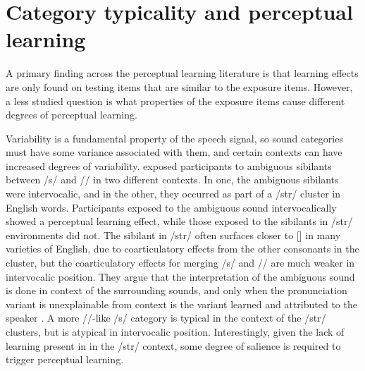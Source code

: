 \section{Category typicality and perceptual learning}
\label{sec:signal}

A primary finding across the perceptual learning literature is that learning effects are only found on testing items that are similar to the exposure items.  However, a less studied question is what properties of the exposure items cause different degrees of perceptual learning.  

Variability is a fundamental property of the speech signal, so sound categories must have some variance associated with them, and certain contexts can have increased degrees of variability.
\citet{Kraljic2008a} exposed participants to ambiguous sibilants between /s/ and /\textesh/ in two different contexts.  
In one, the ambiguous sibilants were intervocalic, and in the other, they occurred as part of a /str/ cluster in English words.  
Participants exposed to the ambiguous sound intervocalically showed a perceptual learning effect, while those exposed to the sibilants in /str/ environments did not.  
The sibilant in /str/ often surfaces closer to [\textesh] in many varieties of English, due to coarticulatory effects from the other consonants in the cluster, but the coarticulatory effects for merging /s/ and /\textesh/ are much weaker in intervocalic position.  
They argue that the interpretation of the ambiguous sound is done in context of the surrounding sounds, and only when the pronunciation variant is unexplainable from context is the variant learned and attributed to the speaker \citep[see also][]{Kraljic2008}.
A more /\textesh/-like /s/ category is typical in the context of the /str/ clusters, but is atypical in intervocalic position.
Interestingly, given the lack of learning present in in the /str/ context, some degree of salience is required to trigger perceptual learning.

